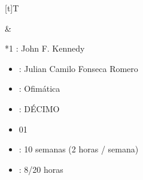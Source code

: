\documentclass[letterpaper,10pt,spanish]{sphinxmanual}
\begin{document}
\begin{savenotes}\sphinxattablestart
\sphinxthistablewithglobalstyle
\centering
\begin{tabular}[t]{}
\sphinxtoprule
\sphinxtableatstartofbodyhook

\begin{savenotes}\sphinxattablestart
\sphinxthistablewithglobalstyle
\centering
\begin{tabulary}{\linewidth}[t]{T}
\sphinxtoprule
\sphinxtableatstartofbodyhook
\sphinxAtStartPar
{}
\\
\sphinxbottomrule
\end{tabulary}
\sphinxtableafterendhook\par
\sphinxattableend\end{savenotes}
&

\begin{savenotes}\sphinxattablestart
\sphinxthistablewithglobalstyle
\raggedright
\begin{tabular}[t]{*{1}{}}
\sphinxtoprule
\sphinxtableatstartofbodyhook
\sphinxAtStartPar
{}: John F. Kennedy
\begin{itemize}
\item {} 
\sphinxAtStartPar
{}: Julian Camilo Fonseca Romero

\item {} 
\sphinxAtStartPar
{}: Ofimática

\item {} 
\sphinxAtStartPar
{}: DÉCIMO

\item {} 
\sphinxAtStartPar
{} 01

\item {} 
\sphinxAtStartPar
{}: 10 semanas (2 horas / semana)

\item {} 
\sphinxAtStartPar
{}: 8/20 horas

\end{itemize}
\\
\sphinxbottomrule
\end{tabular}
\sphinxtableafterendhook\par
\sphinxattableend\end{savenotes}
\\
\sphinxbottomrule
\end{tabular}
\sphinxtableafterendhook\par
\sphinxattableend\end{savenotes}
\end{document}
